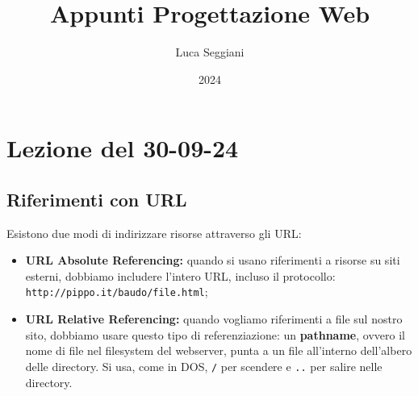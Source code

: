 \documentclass[a4paper,11pt]{article}
\title{Appunti Progettazione Web}
\author{Luca Seggiani}
\date{2024}
\begin{document}
\section{Lezione del 30-09-24}

\thispagestyle{empty}
\pagestyle{fancy}

\subsection{Riferimenti con URL}
Esistono due modi di indirizzare risorse attraverso gli URL:
\begin{itemize}
	\item \textbf{URL Absolute Referencing:} quando si usano riferimenti a risorse su siti esterni, dobbiamo includere l'intero URL, incluso il protocollo: \texttt{http://pippo.it/baudo/file.html}; 
	\item \textbf{URL Relative Referencing:} quando vogliamo riferimenti a file sul nostro sito, dobbiamo usare questo tipo di referenziazione: un \textbf{pathname}, ovvero il nome di file nel filesystem del webserver, punta a un file all'interno dell'albero delle directory.
		Si usa, come in DOS, \texttt{/} per scendere e \texttt{..} per salire nelle directory.
\end{itemize}

\end{document}

